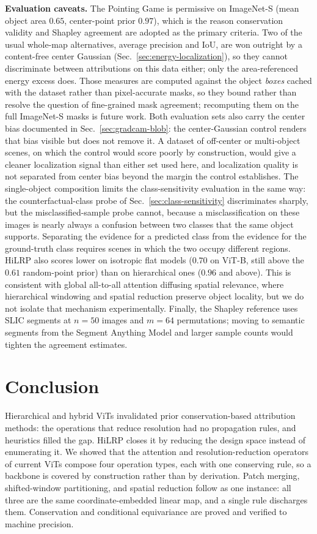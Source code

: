 \documentclass[lettersize,journal]{IEEEtran}
\theoremstyle{definition}
\theoremstyle{plain}
\begin{document}
\textbf{Evaluation caveats.} The Pointing Game is permissive on ImageNet-S (mean object area $0.65$, center-point prior $0.97$), which is the reason conservation validity and Shapley agreement are adopted as the primary criteria. Two of the usual whole-map alternatives, average precision and IoU, are won outright by a content-free center Gaussian (Sec.~\ref{sec:energy-localization}), so they cannot discriminate between attributions on this data either; only the area-referenced energy excess does. Those measures are computed against the object \emph{boxes} cached with the dataset rather than pixel-accurate masks, so they bound rather than resolve the question of fine-grained mask agreement; recomputing them on the full ImageNet-S masks is future work. Both evaluation sets also carry the center bias documented in Sec.~\ref{sec:gradcam-blob}: the center-Gaussian control renders that bias visible but does not remove it. A dataset of off-center or multi-object scenes, on which the control would score poorly by construction, would give a cleaner localization signal than either set used here, and localization quality is not separated from center bias beyond the margin the control establishes. The single-object composition limits the class-sensitivity evaluation in the same way: the counterfactual-class probe of Sec.~\ref{sec:class-sensitivity} discriminates sharply, but the misclassified-sample probe cannot, because a misclassification on these images is nearly always a confusion between two classes that the same object supports. Separating the evidence for a predicted class from the evidence for the ground-truth class requires scenes in which the two occupy different regions. HiLRP also scores lower on isotropic flat models ($0.70$ on ViT-B, still above the $0.61$ random-point prior) than on hierarchical ones ($0.96$ and above). This is consistent with global all-to-all attention diffusing spatial relevance, where hierarchical windowing and spatial reduction preserve object locality, but we do not isolate that mechanism experimentally. Finally, the Shapley reference uses SLIC segments at $n{=}50$ images and $m{=}64$ permutations; moving to semantic segments from the Segment Anything Model and larger sample counts would tighten the agreement estimates.

\section{Conclusion}
\label{sec:conclusion}
Hierarchical and hybrid ViTs invalidated prior conservation-based attribution methods: the
operations that reduce resolution had no propagation rules, and heuristics filled the gap. HiLRP closes it by reducing the design space instead of enumerating it. We showed that the attention and resolution-reduction operators of current ViTs compose four operation types, each with one conserving rule, so a backbone is covered by construction rather than by derivation. Patch merging, shifted-window partitioning, and spatial reduction follow as one instance: all three are the same coordinate-embedded linear map, and a single rule discharges them. Conservation and conditional equivariance are proved and verified to machine precision.
\end{document}
